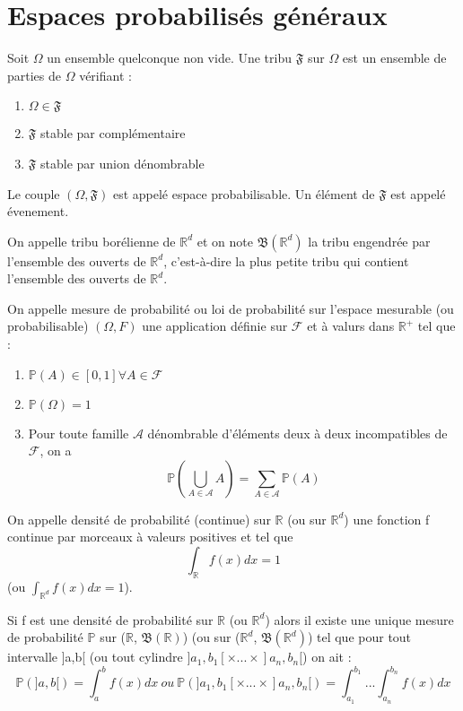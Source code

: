 \section{Espaces probabilisés généraux}
\begin{Def}
Soit $\Omega$ un ensemble quelconque non vide.
Une tribu $\mathfrak{F}$ sur $\Omega$ est un ensemble de parties de $\Omega$ vérifiant :
\begin{enumerate}
\item $\Omega \in \mathfrak{F}$
\item $\mathfrak{F}$ stable par complémentaire
\item $\mathfrak{F}$ stable par union dénombrable
\end{enumerate}
Le couple $(\Omega, \mathfrak{F})$ est appelé espace probabilisable. Un élément de $\mathfrak{F}$ est appelé évenement.
\end{Def}

\begin{Def}
On appelle tribu borélienne de $\mathbb{R}^d$ et on note $\mathfrak{B}(\mathbb{R}^d)$ la tribu engendrée par l'ensemble des ouverts de $\mathbb{R}^d$, c'est-à-dire la plus petite tribu qui contient l'ensemble des ouverts de $\mathbb{R}^d$.
\end{Def}

\begin{Def}
On appelle mesure de probabilité ou loi de probabilité sur l'espace mesurable (ou probabilisable) $(\Omega, F)$ une application définie sur $\mathcal{F}$ et à valurs dans $\mathbb{R}^+$ tel que :
\begin{enumerate}
\item $\mathbb{P}(A) \in [0,1] \forall A \in \mathcal{F}$
\item $\mathbb{P}(\Omega)=1$
\item Pour toute famille $\mathcal{A}$ dénombrable d'éléments deux à deux incompatibles de $\mathcal{F}$, on a \[\mathbb{P}(\bigcup_{A \in \mathcal{A}} A) = \sum_{A \in \mathcal{A}} \mathbb{P}(A)\]
\end{enumerate}
\end{Def}

\begin{Def}
On appelle densité de probabilité (continue) sur $\mathbb{R}$ (ou sur $\mathbb{R}^d$) une fonction f continue par morceaux à valeurs positives et tel que \[\int_{\mathbb{R}}f(x)dx=1\] (ou $\int_{\mathbb{R}^d}f(x)dx=1$).
\end{Def}

\begin{theo}
Si f est une densité de probabilité sur $\mathbb{R}$ (ou $\mathbb{R}^d$) alors il existe une unique mesure de probabilité $\mathbb{P}$ sur ($\mathbb{R}$, $\mathfrak{B}(\mathbb{R})$) (ou sur ($\mathbb{R}^d$, $\mathfrak{B}(\mathbb{R}^d)$) tel que pour tout intervalle ]a,b[ (ou tout cylindre $]a_1,b_1[\times...\times]a_n,b_n[$) on ait : 
\[\mathbb{P}(]a,b[)=\int_a^b f(x)dx\ ou \  \mathbb{P}(]a_1,b_1[\times...\times]a_n,b_n[)=\int_{a_1}^{b_1}...\int_{a_n}^{b_n} f(x)dx\]
\end{theo}

